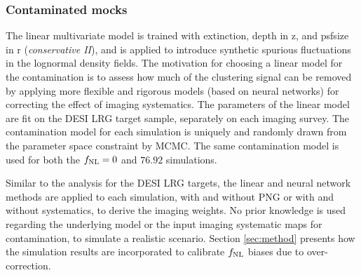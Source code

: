 \subsubsection{Contaminated mocks}
The linear multivariate model is trained with extinction, depth in z, and psfsize in r (\textit{conservative II}), and is applied to introduce synthetic spurious fluctuations in the lognormal density fields. The motivation for choosing a linear model for the contamination is to assess how much of the clustering signal can be removed by applying more flexible and rigorous models (based on neural networks) for correcting the effect of imaging systematics. The parameters of the linear model are fit on the DESI LRG target sample, separately on each imaging survey. The contamination model for each simulation is uniquely and randomly drawn from the parameter space constraint by MCMC. The same contamination model is used for both the $f_{\rm NL}=0$ and $76.92$ simulations.

Similar to the analysis for the DESI LRG targets, the linear and neural network methods are applied to each simulation, with and without PNG or with and without systematics, to derive the imaging weights. No prior knowledge is used regarding the underlying model or the input imaging systematic maps for contamination, to simulate a realistic scenario. Section \ref{sec:method} presents how the simulation results are incorporated to calibrate $f_{\rm NL}$ biases due to over-correction. 
